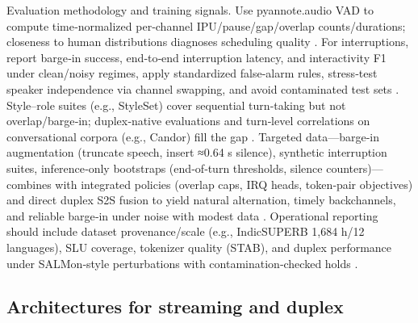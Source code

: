 Evaluation methodology and training signals. Use pyannote.audio VAD to compute time‑normalized per‑channel IPU/pause/gap/overlap counts/durations; closeness to human distributions diagnoses scheduling quality \cite{lu2025slideintegratingspeechlanguagemodelllmsp}. For interruptions, report barge‑in success, end‑to‑end interruption latency, and interactivity F1 under clean/noisy regimes, apply standardized false‑alarm rules, stress‑test speaker independence via channel swapping, and avoid contaminated test sets \cite{maimon2025salmonsuiteacousticlanguagemodelevaluati,tseng2025evaluationllmsspeechisoftenflawedtestset,wang2025ntppgenerativespeechlanguagemodelingdual}. Style–role suites (e.g., StyleSet) cover sequential turn‑taking but not overlap/barge‑in; duplex‑native evaluations and turn‑level correlations on conversational corpora (e.g., Candor) fill the gap \cite{chiang2025audioawarelargelanguagemodelsasjudgesspe,cui2025thinkbeforeyoutalkenhancingmeaningfuldia}. Targeted data—barge‑in augmentation (truncate speech, insert ≈0.64 s silence), synthetic interruption suites, inference‑only bootstraps (end‑of‑turn thresholds, silence counters)—combines with integrated policies (overlap caps, IRQ heads, token‑pair objectives) and direct duplex S2S fusion to yield natural alternation, timely backchannels, and reliable barge‑in under noise with modest data \cite{hu2025salmduplexefficientdirectmodelingspeechl,wang2023slmbridgethingapbetweenspeechtextfoundat,wang2025dualspeechlmtowardsunifiedspeechundersta}. Operational reporting should include dataset provenance/scale (e.g., IndicSUPERB 1,684 h/12 languages), SLU coverage, tokenizer quality (STAB), and duplex performance under SALMon‑style perturbations with contamination‑checked holds \cite{entry2025indicsuperbspeechprocessinguniversalperf,vashishth2024stabspeechtokenizerassessmentbenchmark,maimon2025salmonsuiteacousticlanguagemodelevaluati,yang2024buildingtaiwanesemandarinspokenlanguagem}.



\subsection{Architectures for streaming and duplex} \label{subsec:Architectures for streaming and duplex}

